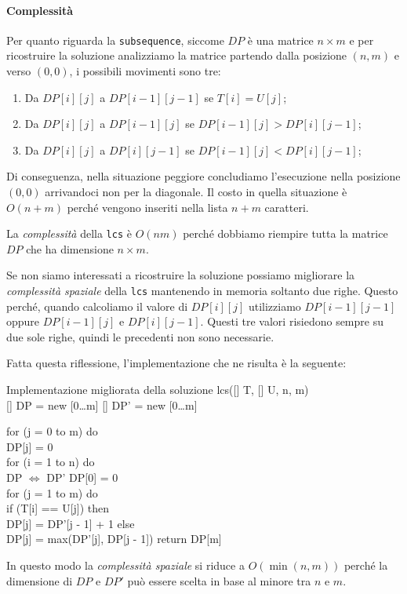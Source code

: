 \paragraph{Complessità}
Per quanto riguarda la \texttt{subsequence}, siccome $DP$ è una matrice $n\times
m$ e per ricostruire la soluzione analizziamo la matrice partendo dalla posizione
$(n,m)$ e  verso $(0,0)$, i possibili movimenti sono tre:
\begin{enumerate}
    \item Da $DP[i][j]$ a $DP[i-1][j-1]$ se $T[i]=U[j]$;
    \item Da $DP[i][j]$ a $DP[i-1][j]$ se $DP[i-1][j]>DP[i][j-1]$;
    \item Da $DP[i][j]$ a $DP[i][j-1]$ se $DP[i-1][j]<DP[i][j-1]$;
\end{enumerate}
Di conseguenza, nella situazione peggiore concludiamo l'esecuzione nella
posizione $(0,0)$ arrivandoci non per la diagonale. Il costo in quella
situazione è $O(n+m)$ perché vengono inseriti nella lista $n+m$ caratteri.

La \emph{complessità} della \texttt{lcs} è $O(nm)$ perché dobbiamo riempire
tutta la matrice $DP$ che ha dimensione $n\times m$.

\bigskip\noindent
Se non siamo interessati a ricostruire la soluzione possiamo migliorare la
\emph{complessità spaziale} della \texttt{lcs} mantenendo in memoria soltanto
due righe. Questo perché, quando calcoliamo il valore di $DP[i][j]$ utilizziamo
$DP[i-1][j-1]$ oppure $DP[i-1][j]$ e $DP[i][j-1]$. Questi tre valori risiedono
sempre su due sole righe, quindi le precedenti non sono necessarie.

Fatta questa riflessione, l'implementazione che ne risulta è la seguente:
\begin{minicode}{Implementazione migliorata della soluzione}
\ind{} lcs([] T, [] U,  n,  m)\\
    [] DP = new [0\dots m]\hfill{}
    [] DP' = new [0\dots m]\hfill{}

    \indf for (j = 0 to m) do\\
        DP[j] = 0\\
    \indf for (i = 1 to n) do\\
        DP $\Leftrightarrow$ DP'\hfill{}
        DP[0] = 0\\
        \indff for (j = 1 to m) do\\
            \indfff if (T[i] == U[j]) then\\
                DP[j] = DP'[j - 1] + 1\hfill{}
            \indfff else\\
                DP[j] = max(DP'[j], DP[j - 1])\hfill{}
    \indf return DP[m]
\end{minicode}\noindent
In questo modo la \emph{complessità spaziale} si riduce a $O(\min(n,m))$ perché
la dimensione di $DP$ e $DP'$ può essere scelta in base al minore tra $n$ e $m$.

